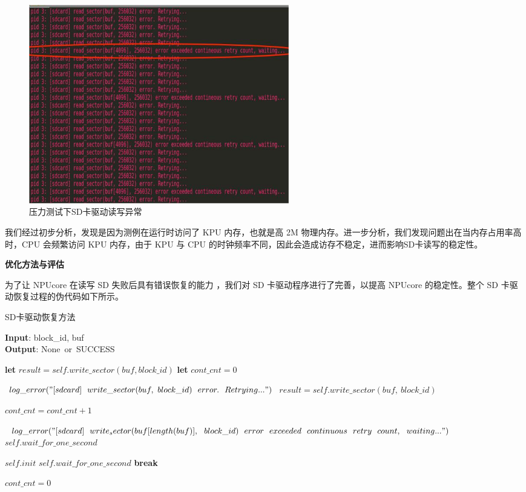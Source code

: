 \begin{figure}[h]
	\centering
	\includegraphics[width=0.55\textwidth]{figures/10-04-SD卡驱动异常.jpg}
	\caption{压力测试下SD卡驱动读写异常}
	\label{fig:SD error}
\end{figure}

我们经过初步分析，发现是因为测例在运行时访问了 KPU 内存，也就是高 2M 物理内存。进一步分析，我们发现问题出在当内存占用率高时，CPU 会频繁访问 KPU 内存，由于 KPU 与 CPU 的时钟频率不同，因此会造成访存不稳定，进而影响SD卡读写的稳定性。

\textbf{优化方法与评估}

为了让 NPUcore 在读写 SD 失败后具有错误恢复的能力 ，我们对 SD 卡驱动程序进行了完善，以提高 NPUcore 的稳定性。整个 SD 卡驱动恢复过程的伪代码如下所示。

\begin{algorithm}[tb]
	\caption{SD卡驱动恢复方法}
	\label{alg:sdcard_recovery}
	\textbf{Input}: block\_id, buf\\
	\textbf{Output}: None~or~SUCCESS
	\begin{algorithmic}[1] %
		
		\State \textbf{let} $result = self.write\_sector(buf, block\_id)$
		\State \textbf{let} $cont\_cnt = 0$
		
		\State $log\_error("[sdcard]~~write\_sector(buf,~block\_id)~~error.~~Retrying...")$
		\State $result=self.write\_sector(buf,~block\_id)$
		\EndIf
		
		\State $cont\_cnt = cont\_cnt + 1$
		
		\State $log\_error("[sdcard]~~write_sector(buf[length(buf)],~~block\_id)~~error~~exceeded~~continuous~~retry~~count,~~waiting...")$
		\State $self.wait\_for\_one\_second$
		
		\State $self.init$
		\State $self.wait\_for\_one\_second$
		\Else
		\State \textbf{break}
		\EndIf
		
		\State $cont\_cnt = 0$
		\EndIf
		\EndWhile
	\end{algorithmic}
\end{algorithm}

